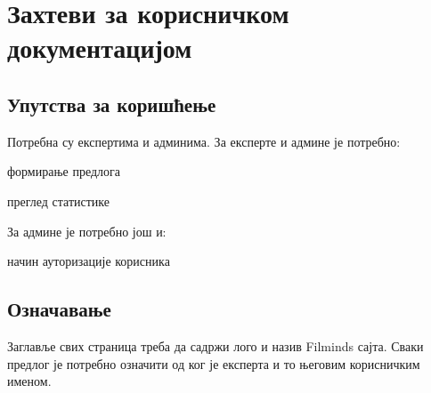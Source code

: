 \section{Захтеви за корисничком документацијом}

\subsection{Упутства за коришћење }
Потребна су експертима и админима. 
За експерте и админе је потребно:
\begin{description}[font=$\bullet$~\normalfont\scshape]
\item формирање предлога
\item преглед статистике
\end{description}
За админе је потребно још и:
\begin{description}[font=$\bullet$~\normalfont\scshape]
\item начин ауторизације корисника
\end{description}
\subsection{Означавање}
Заглавље свих страница треба да садржи лого и назив Filminds сајта. Сваки предлог је потребно означити од ког је експерта и то његовим корисничким именом.